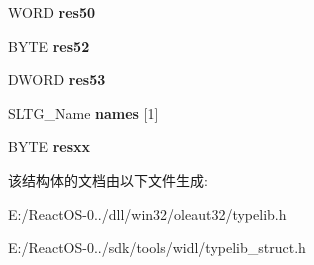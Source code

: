 \begin{DoxyCompactItemize}
W\+O\+RD {\bfseries res50}
\item 
\mbox{\label{struct_s_l_t_g___ref_info_ac5f31175e010bffb4ab720ecea07e8b4}} 
B\+Y\+TE {\bfseries res52}
\item 
\mbox{\label{struct_s_l_t_g___ref_info_aeb9671c6bb3ad5582688143f736f0084}} 
D\+W\+O\+RD {\bfseries res53}
\item 
\mbox{\label{struct_s_l_t_g___ref_info_a2faebbc132dda7b48e4a004243859f32}} 
S\+L\+T\+G\+\_\+\+Name {\bfseries names} \mbox{[}1\mbox{]}
\item 
\mbox{\label{struct_s_l_t_g___ref_info_a14422861d7798e3793005fe7d00104dc}} 
B\+Y\+TE {\bfseries resxx}
\end{DoxyCompactItemize}


该结构体的文档由以下文件生成\+:\begin{DoxyCompactItemize}
\item 
E\+:/\+React\+O\+S-\/0../dll/win32/oleaut32/typelib.\+h\item 
E\+:/\+React\+O\+S-\/0../sdk/tools/widl/typelib\+\_\+struct.\+h\end{DoxyCompactItemize}

